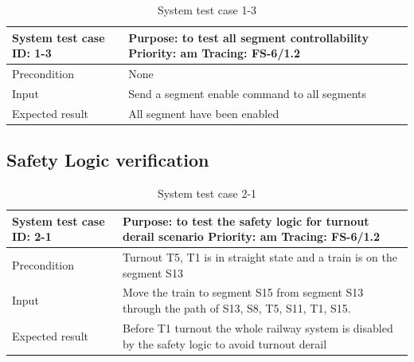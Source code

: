 \begin{table}[H]
	\caption{System test case 1-3}
	\label{table:TCase-FSS1-3}
	\begin{center}
		\renewcommand{\arraystretch}{1.8}
		\begin{tabu} 
			to 0.9 \textwidth
			{  X[0.3, l] X[l] }
			\toprule
			System test case ID: 1-3 & Purpose: to test all segment controllability \newline Priority: am \newline Tracing: FS-6/1.2 \\ \midrule
			Precondition             & None                                                                                          \\
			Input                    & Send a segment enable command to all segments                                                 \\
			Expected result          & All segment have been enabled                                                                 \\ \bottomrule
		\end{tabu}
	\end{center}
\end{table}

\subsection{Safety Logic verification}
\begin{table}[H]
	\caption{System test case 2-1}
	\label{table:TCase-FSS2-1}
	\begin{center}
		\renewcommand{\arraystretch}{1.8}
		\begin{tabu} 
			to 0.9 \textwidth
			{  X[0.3, l] X[l] }
			\toprule
			System test case ID: 2-1 & Purpose: to test the safety logic for turnout derail scenario   \newline Priority: am \newline Tracing: FS-6/1.2 \\ \midrule
			Precondition             & Turnout T5, T1 is in straight state and a train is on the segment S13                                            \\
			Input                    & Move the train to segment S15 from segment S13 through the path of S13, S8, T5, S11, T1, S15.                    \\
			Expected result          & Before T1 turnout the whole railway system is disabled by the safety logic to avoid turnout derail               \\ \bottomrule
		\end{tabu}
	\end{center}
\end{table}

